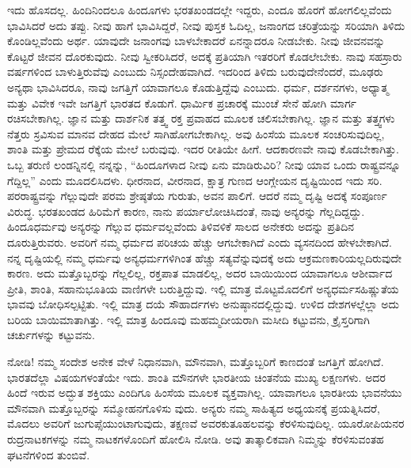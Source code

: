 ಇದು ಹೊಸದಲ್ಲ. ಹಿಂದಿನಿಂದಲೂ ಹಿಂದೂಗಳು ಭರತಖಂಡದಲ್ಲೇ ಇದ್ದರು, ಎಂದೂ ಹೊರಗೆ ಹೋಗಲಿಲ್ಲವೆಂದು ಭಾವಿಸಿದರೆ ಅದು ತಪ್ಪು. ನೀವು ಹಾಗೆ ಭಾವಿಸಿದ್ದರೆ, ನೀವು ಪುಸ್ತಕ ಓದಿಲ್ಲ, ಜನಾಂಗದ ಚರಿತ್ರೆಯನ್ನು ಸರಿಯಾಗಿ ತಿಳಿದು ಕೊಂಡಿಲ್ಲವೆಂದು ಅರ್ಥ. ಯಾವುದೇ ಜನಾಂಗವು ಬಾಳಬೇಕಾದರೆ ಏನನ್ನಾದರೂ ನೀಡಬೇಕು. ನೀವು ಜೀವನವನ್ನು ಕೊಟ್ಟರೆ ಜೀವನ ದೊರಕುವುದು. ನೀವು ಸ್ವೀಕರಿಸಿದರೆ, ಅದಕ್ಕೆ ಪ್ರತಿಯಾಗಿ ಇತರರಿಗೆ ಕೊಡಲೇಬೇಕು. ನಾವು ಸಹಸ್ರಾರು ವರ್ಷಗಳಿಂದ ಬಾಳುತ್ತಿರುವೆವು ಎಂಬುದು ನಿಸ್ಸಂದೇಹವಾಗಿದೆ. ಇದರಿಂದ ತಿಳಿದು ಬರುವುದೇನೆಂದರೆ, ಮೂಢರು ಅನ್ಯಥಾ ಭಾವಿಸಿದರೂ, ನಾವು ಜಗತ್ತಿಗೆ ಯಾವಾಗಲೂ ಕೊಡುತ್ತಿದ್ದೆವು ಎಂಬುದು. ಧರ್ಮ, ದರ್ಶನಗಳು, ಅಧ್ಯಾತ್ಮ ಮತ್ತು ವಿವೇಕ ಇವೇ ಜಗತ್ತಿಗೆ ಭಾರತದ ಕೊಡುಗೆ. ಧಾರ್ಮಿಕ ಪ್ರಚಾರಕ್ಕೆ ಮುಂಚೆ ಸೇನೆ ಹೋಗಿ ಮಾರ್ಗ ರಚಿಸಬೇಕಾಗಿಲ್ಲ. ಜ್ಞಾನ ಮತ್ತು ದಾರ್ಶನಿಕ ತತ್ತ್ವ ರಕ್ತ ಪ್ರವಾಹದ ಮೂಲಕ ಚಲಿಸಬೇಕಾಗಿಲ್ಲ. ಜ್ಞಾನ ಮತ್ತು ತತ್ತ್ವಗಳು ನೆತ್ತರು ಸ್ರವಿಸುವ ಮಾನವ ದೇಹದ ಮೇಲೆ ಸಾಗಿಹೋಗಬೇಕಾಗಿಲ್ಲ. ಅವು ಹಿಂಸೆಯ ಮೂಲಕ ಸಂಚರಿಸುವುದಿಲ್ಲ, ಶಾಂತಿ ಮತ್ತು ಪ್ರೇಮದ ರೆಕ್ಕೆಯ ಮೇಲೆ ಬರುವುವು. ಇದರ ರೀತಿಯೇ ಹೀಗೆ. ಆದಕಾರಣವೇ ನಾವು ಕೊಡಬೇಕಾಗಿತ್ತು. ಒಬ್ಬ ತರುಣಿ ಲಂಡನ್ನಿನಲ್ಲಿ ನನ್ನನ್ನು, “ಹಿಂದೂಗಳಾದ ನೀವು ಏನು ಮಾಡಿರುವಿರಿ? ನೀವು ಯಾವ ಒಂದು ರಾಷ್ಟ್ರವನ್ನೂ ಗೆದ್ದಿಲ್ಲ” ಎಂದು ಮೂದಲಿಸಿದಳು. ಧೀರನಾದ, ವೀರನಾದ, ಕ್ಷಾತ್ರ ಗುಣದ ಆಂಗ್ಲೇಯನ ದೃಷ್ಟಿಯಿಂದ ಇದು ಸರಿ. ಪರರಾಷ್ಟ್ರವನ್ನು ಗೆಲ್ಲುವುದೇ ಪರಮ ಶ್ರೇಷ್ಠತೆಯ ಗುರುತು, ಅವನ ಪಾಲಿಗೆ. ಆದರೆ ನಮ್ಮ ದೃಷ್ಟಿ ಅದಕ್ಕೆ ಸಂಪೂರ್ಣ ವಿರುದ್ಧ. ಭರತಖಂಡದ ಹಿರಿಮೆಗೆ ಕಾರಣ, ನಾನು ಪರ್ಯಾಲೋಚಿಸಿದಂತೆ, ನಾವು ಅನ್ಯರನ್ನು ಗೆಲ್ಲದಿದ್ದದ್ದು. ಹಿಂದೂಧರ್ಮವು ಅನ್ಯರನ್ನು ಗೆಲ್ಲುವ ಧರ್ಮವಲ್ಲವೆಂದು ತಿಳಿವಳಿಕೆ ಸಾಲದ ಅನೇಕರು ಅದನ್ನು ಪ್ರತಿದಿನ ದೂರುತ್ತಿರುವರು. ಅವರಿಗೆ ನಮ್ಮ ಧರ್ಮದ ಪರಿಚಯ ಹೆಚ್ಚು ಆಗಬೇಕಾಗಿದೆ ಎಂದು ವ್ಯಸನದಿಂದ ಹೇಳಬೇಕಾಗಿದೆ. ನನ್ನ ದೃಷ್ಟಿಯಲ್ಲಿ ನಮ್ಮ ಧರ್ಮವು ಅನ್ಯಧರ್ಮಗಳಿಗಿಂತ ಹೆಚ್ಚು ಸತ್ಯವೆನ್ನುವುದಕ್ಕೆ ಅದು ಆಕ್ರಮಣಕಾರಿಯಲ್ಲದಿರುವುದೇ ಕಾರಣ. ಅದು ಮತ್ತೊಬ್ಬರನ್ನು ಗೆಲ್ಲಲಿಲ್ಲ, ರಕ್ತಪಾತ ಮಾಡಲಿಲ್ಲ, ಅದರ ಬಾಯಿಯಿಂದ ಯಾವಾಗಲೂ ಆಶೀರ್ವಾದ ಪ್ರೀತಿ, ಶಾಂತಿ, ಸಹಾನುಭೂತಿಯ ವಾಣಿಗಳೇ ಬರುತ್ತಿದ್ದುವು. ಇಲ್ಲಿ ಮಾತ್ರ ಮೊಟ್ಟಮೊದಲಿಗೆ ಅನ್ಯಧರ್ಮಸಹಿಷ್ಣುತೆಯ ಭಾವವು ಬೋಧಿಸಲ್ಪಟ್ಟಿತು. ಇಲ್ಲಿ ಮಾತ್ರ ದಯೆ ಸೌಹಾರ್ದಗಳು ಅನುಷ್ಠಾನದಲ್ಲಿದ್ದುವು. ಉಳಿದ ದೇಶಗಳಲ್ಲೆಲ್ಲಾ ಅದು ಬರಿಯ ಬಾಯಿಮಾತಾಗಿತ್ತು. ಇಲ್ಲಿ ಮಾತ್ರ ಹಿಂದೂವು ಮಹಮ್ಮದೀಯರಾಗಿ ಮಸೀದಿ ಕಟ್ಟುವನು, ಕ್ರೈಸ್ತರಿ\-ಗಾಗಿ ಚರ್ಚುಗಳನ್ನು ಕಟ್ಟುವನು.

ನೋಡಿ! ನಮ್ಮ ಸಂದೇಶ ಅನೇಕ ವೇಳೆ ನಿಧಾನವಾಗಿ, ಮೌನವಾಗಿ, ಮತ್ತೊಬ್ಬರಿಗೆ ಕಾಣದಂತೆ ಜಗತ್ತಿಗೆ ಹೋಗಿದೆ. ಭಾರತದೆಲ್ಲಾ ವಿಷಯಗಳಂತೆಯೇ ಇದು. ಶಾಂತಿ ಮೌನಗಳೇ ಭಾರತೀಯ ಚಿಂತನೆಯ ಮುಖ್ಯ ಲಕ್ಷಣಗಳು. ಅದರ ಹಿಂದೆ ಇರುವ ಅದ್ಭುತ ಶಕ್ತಿಯು ಎಂದಿಗೂ ಹಿಂಸೆಯ ಮೂಲಕ ವ್ಯಕ್ತವಾಗಿಲ್ಲ. ಯಾವಾಗಲೂ ಭಾರತೀಯ ಭಾವನೆಯು ಮೌನವಾಗಿ ಮತ್ತೊಬ್ಬರನ್ನು ಸಮ್ಮೋಹನಗೊಳಿಸು ವುದು. ಅನ್ಯರು ನಮ್ಮ ಸಾಹಿತ್ಯದ ಅಧ್ಯಯನಕ್ಕೆ ಪ್ರಯತ್ನಿಸಿದರೆ, ಮೊದಲು ಅವರಿಗೆ ಜುಗುಪ್ಸೆಯುಂಟಾಗುವುದು, ತಕ್ಷಣವೆ ಅವರ\break ಕುತೂಹಲವನ್ನು ಕೆರಳಿಸುವುದಿಲ್ಲ. ಯೂರೋಪಿಯನರ ರುದ್ರನಾಟಕಗಳನ್ನು ನಮ್ಮ ನಾಟಕಗಳೊಂದಿಗೆ ಹೋಲಿಸಿ ನೋಡಿ. ಅವು ತಾತ್ಕಾಲಿಕವಾಗಿ ನಿಮ್ಮನ್ನು ಕೆರಳಿಸುವಂತಹ ಘಟನೆಗಳಿಂದ ತುಂಬಿವೆ.

